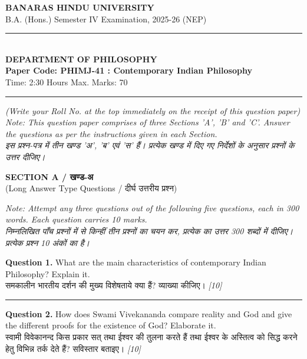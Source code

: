 \documentclass[11pt,a4paper]{article}
\newcommand{\pts}[1]{\hfill \textit{[#1]}}
\begin{document}
\begin{center}
  {\large\bfseries BANARAS HINDU UNIVERSITY}\\[2pt]
  {\normalsize B.A. (Hons.) Semester IV Examination, 2025-26 (NEP)}\\[6pt]
  \rule{0.8\linewidth}{0.5pt}\\[6pt]
  {\large\bfseries DEPARTMENT OF PHILOSOPHY}\\[4pt]
  {\large\bfseries Paper Code: PHIMJ-41 : Contemporary Indian Philosophy}\\[4pt]
  {\normalsize Time: 2:30 Hours \hfill Max. Marks: 70}
\end{center}

\rule{\linewidth}{0.4pt}

\smallskip

\noindent \textit{(Write your Roll No. at the top immediately on the receipt of this question paper)}\\[2pt]
\noindent \textit{Note: This question paper comprises of three Sections 'A', 'B' and 'C'. Answer the questions as per the instructions given in each Section.}\\[1pt]
\noindent \textit{इस प्रश्न-पत्र में तीन खण्ड 'अ', 'ब' एवं 'स' हैं। प्रत्येक खण्ड में दिए गए निर्देशों के अनुसार प्रश्नों के उत्तर दीजिए।}

\bigskip

\begin{center}
  {\large\bfseries SECTION A / खण्ड-अ}\\[2pt]
  {\normalsize (Long Answer Type Questions / दीर्घ उत्तरीय प्रश्न)}
\end{center}

\noindent \textit{Note: Attempt any three questions out of the following five questions, each in 300 words. Each question carries 10 marks.}\\[2pt]
\noindent \textit{निम्नलिखित पाँच प्रश्नों में से किन्हीं तीन प्रश्नों का चयन कर, प्रत्येक का उत्तर 300 शब्दों में दीजिए। प्रत्येक प्रश्न 10 अंकों का है।}

\bigskip

\noindent \textbf{Question 1.} What are the main characteristics of contemporary Indian Philosophy? Explain it.\\[1pt]
समकालीन भारतीय दर्शन की मुख्य विशेषताये क्या हैं? व्याख्या कीजिए। \pts{10}

\medskip\rule{\linewidth}{0.2pt}\medskip

\noindent \textbf{Question 2.} How does Swami Vivekananda compare reality and God and give the different proofs for the existence of God? Elaborate it.\\[1pt]
स्वामी विवेकानन्द किस प्रकार सत् तथा ईश्वर की तुलना करते हैं तथा ईश्वर के अस्तित्व को सिद्ध करने हेतु विभिन्न तर्क देते हैं? सविस्तार बताइए। \pts{10}
\end{document}
